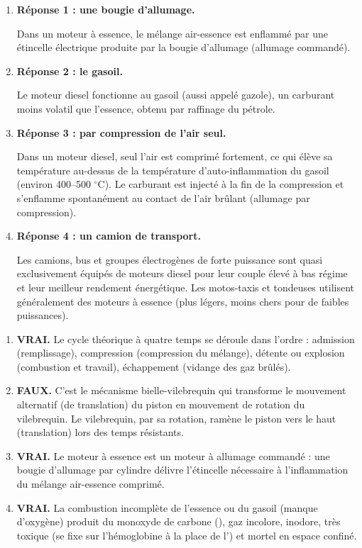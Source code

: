 \documentclass[11pt]{article}
\begin{document}
\begin{corrige}
\begin{enumerate}
\item \textbf{Réponse 1 : une bougie d'allumage.}
      \par Dans un moteur à essence, le mélange air-essence est enflammé par une étincelle électrique produite par la bougie d'allumage (allumage commandé).
\item \textbf{Réponse 2 : le gasoil.}
      \par Le moteur diesel fonctionne au gasoil (aussi appelé gazole), un carburant moins volatil que l'essence, obtenu par raffinage du pétrole.
\item \textbf{Réponse 3 : par compression de l'air seul.}
      \par Dans un moteur diesel, seul l'air est comprimé fortement, ce qui élève sa température au-dessus de la température d'auto-inflammation du gasoil (environ 400--500 $^\circ\mathrm{C}$). Le carburant est injecté à la fin de la compression et s'enflamme spontanément au contact de l'air brûlant (allumage par compression).
\item \textbf{Réponse 4 : un camion de transport.}
      \par Les camions, bus et groupes électrogènes de forte puissance sont quasi exclusivement équipés de moteurs diesel pour leur couple élevé à bas régime et leur meilleur rendement énergétique. Les motos-taxis et tondeuses utilisent généralement des moteurs à essence (plus légers, moins chers pour de faibles puissances).
\end{enumerate}
\end{corrige}

\begin{corrige}
\begin{enumerate}
\item \textbf{VRAI.} Le cycle théorique à quatre temps se déroule dans l'ordre : admission (remplissage), compression (compression du mélange), détente ou explosion (combustion et travail), échappement (vidange des gaz brûlés).
\item \textbf{FAUX.} C'est le mécanisme bielle-vilebrequin qui transforme le mouvement alternatif (de translation) du piston en mouvement de rotation du vilebrequin. Le vilebrequin, par sa rotation, ramène le piston vers le haut (translation) lors des temps résistants.
\item \textbf{VRAI.} Le moteur à essence est un moteur à allumage commandé : une bougie d'allumage par cylindre délivre l'étincelle nécessaire à l'inflammation du mélange air-essence comprimé.
\item \textbf{VRAI.} La combustion incomplète de l'essence ou du gasoil (manque d'oxygène) produit du monoxyde de carbone (), gaz incolore, inodore, très toxique (se fixe sur l'hémoglobine à la place de l') et mortel en espace confiné.
\end{enumerate}
\end{corrige}
\end{document}
